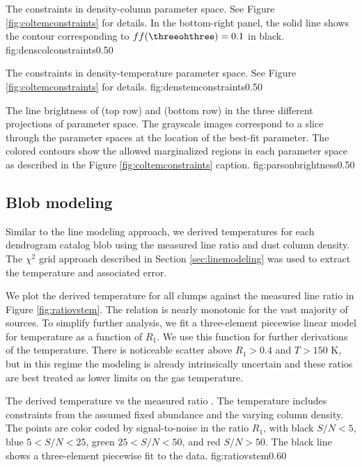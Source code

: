 {The constraints in density-column parameter space.
See Figure \ref{fig:coltemconstraints} for details.  In the bottom-right panel, the
solid line shows the contour corresponding to $ff(\threeohthree)=0.1$ in
black.}
{fig:denscolconstraints}{0.5}{0}

{The constraints in density-temperature parameter space.
See Figure \ref{fig:coltemconstraints} for details.}
{fig:denstemconstraints}{0.5}{0}

{The line brightness of \para \threeohthree (top row) and \para \threetwoone
(bottom row) in the three different projections of parameter space.  The
grayscale images correspond to a slice through the parameter spaces at the
location of the best-fit parameter.  The colored contours show the allowed
marginalized regions in each parameter space as described in the
Figure \ref{fig:coltemconstraints} caption.}
{fig:parsonbrightness}{0.5}{0}

\subsection{Blob modeling}
\label{sec:dendromod}
Similar to the line modeling approach, we derived temperatures for each
dendrogram catalog blob using the measured line ratio and dust column density.
The $\chi^2$ grid approach described in Section \ref{sec:linemodeling} was used
to extract the temperature and associated error.

We plot the derived temperature for all clumps against the measured line ratio
in Figure \ref{fig:ratiovstem}.  The relation is nearly monotonic for the vast
majority of sources.  To simplify further analysis, we fit a three-element
piecewise linear model for temperature as a function of $R_1$.  We use this
function for further derivations of the temperature.  There is noticeable
scatter above $R_1 > 0.4$ and $T>150$ K, but in this regime the modeling is
already intrinsically uncertain and these ratios are best treated as lower
limits on the gas temperature.

{The derived temperature vs the measured ratio \Rone.  The temperature
includes constraints from the assumed fixed \formaldehyde abundance and the 
varying column density.  The points are color coded by signal-to-noise in the
ratio $R_1$, with black $S/N < 5$, blue $5 < S/N < 25$, green $25 < S/N < 50$,
and red $S/N > 50$.  The black line shows a three-element piecewise fit
to the data.
}
{fig:ratiovstem}{0.6}{0}

